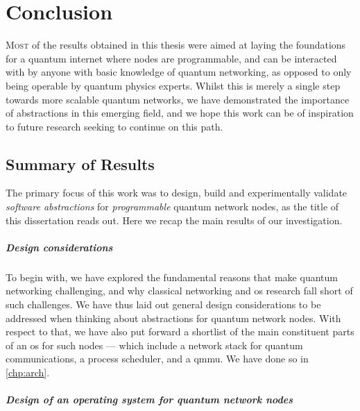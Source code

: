 \chapter{Conclusion}
\label{chp:conclusion}

\lettrine{M}{ost} of the results obtained in this thesis were aimed at laying the foundations for a
quantum internet where nodes are programmable, and can be interacted with by anyone with basic
knowledge of quantum networking, as opposed to only being operable by quantum physics experts.
Whilst this is merely a single step towards more scalable quantum networks, we have demonstrated the
importance of abstractions in this emerging field, and we hope this work can be of inspiration to
future research seeking to continue on this path.

\section{Summary of Results}

The primary focus of this work was to design, build and experimentally validate \emph{software
abstractions} for \emph{programmable} quantum network nodes, as the title of this dissertation reads
out. Here we recap the main results of our investigation.

\paragraph{Design considerations}

To begin with, we have explored the fundamental reasons that make quantum networking challenging,
and why classical networking and \acrfull{os} research fall short of such challenges. We have thus
laid out general design considerations to be addressed when thinking about abstractions for quantum
network nodes. With respect to that, we have also put forward a shortlist of the main constituent
parts of an \acrshort{os} for such nodes --- which include a network stack for quantum
communications, a process scheduler, and a \acrlong{qmmu}. We have done so in \cref{chp:arch}.

\paragraph{Design of an operating system for quantum network nodes}

